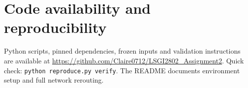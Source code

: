 \section*{Code availability and reproducibility}
Python scripts, pinned dependencies, frozen inputs and validation instructions are available at \url{https://github.com/Claire0712/LSGI2802_Assignment2}. Quick check: \texttt{python reproduce.py verify}. The README documents environment setup and full network rerouting.
